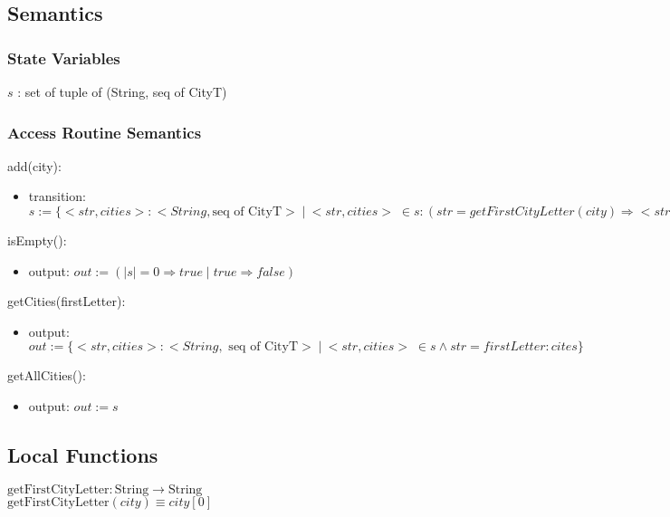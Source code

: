 \documentclass[12pt]{article}
\begin{document}
\newpage

\subsection* {Semantics}

\subsubsection* {State Variables}

$\mathit{s}$ : set of tuple of (String, seq of CityT)

\subsubsection* {Access Routine Semantics}

\noindent add(city):
\begin{itemize}
\item transition: $s := \{<str,cities> : <String, \mbox{seq of CityT} > \;|\: <str, cities> \;\in s: (str = getFirstCityLetter(city) \Rightarrow <str, cities || [city]> \;|\: true \Rightarrow <str, cities> )\}$ 
\end{itemize}

\noindent isEmpty():
\begin{itemize}
\item output: $\mathit{out} := (|s| = 0 \Rightarrow true \;|\; true \Rightarrow false)$
\end{itemize}


\noindent getCities(firstLetter):
\begin{itemize}
\item output: $\mathit{out} := \{<str,cities> : <String, \mbox{ seq of CityT} > \;|\: <str, cities> \;\in s \land str = firstLetter :cites \}$ 
\end{itemize}

\noindent getAllCities():
\begin{itemize}
\item output: $\mathit{out} := s$ 
\end{itemize}

\subsection*{Local Functions}

\noindent $\text{getFirstCityLetter}: \text{String} \rightarrow \text{String}$\\
\noindent $\text{getFirstCityLetter}(city) \equiv city[0]$\\
\end{document}
